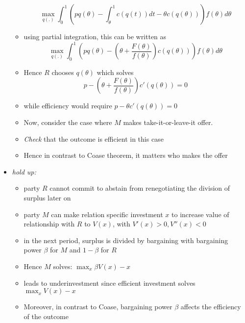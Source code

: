 \documentclass[11pt,english]{beamer}
\begin{document}
\begin{frame}[allowframebreaks]
\begin{itemize}
\begin{itemize}
\begin{equation*}
      \max_{q(.)} \int_0^1 (pq(\theta)-\int_\theta^1 c(q(t))dt -\theta c(q(\theta)))f(\theta)d\theta
    \end{equation*}
  \item using partial integration, this can be written as
    \begin{equation*}
      \max_{q(.)} \int_0^1
      (pq(\theta)-\left(\theta+\frac{F(\theta)}{f(\theta)} \right) c(q(\theta)))f(\theta)d\theta
    \end{equation*}
  \item Hence $R$ chooses $q(\theta)$ which solves
    \begin{equation*}
      p-\left(\theta+\frac{F(\theta)}{f(\theta)} \right) c'(q(\theta))=0
    \end{equation*}
  \item while efficiency would require $p-\theta c'(q(\theta)) =0$
  \item Now, consider the case where $M$ makes take-it-or-leave-it
    offer.
  \item \emph{Check} that the outcome is efficient in this case
  \item Hence in contrast to Coase theorem, it matters who makes the offer
    \end{itemize}
  \item \emph{hold up:}
    \begin{itemize}
    \item party $R$ cannot commit to abstain from renegotiating the division
      of surplus later on
    \item party $M$ can make relation specific investment $x$ to
    increase value of relationship with $R$ to $V(x)$, with $V'(x)>0, V''(x)<0$
  \item in the next period, surplus is divided by bargaining with bargaining
    power $\beta$ for $M$ and $1-\beta$ for $R$
  \item Hence $M$ solves: $\max_x \beta V(x) - x$
  \item leads to underinvestment since efficient investment solves
    $\max_x V(x) -x$
  \item Moreover, in contrast to Coase, bargaining power $\beta$
    affects the efficiency of the outcome
    \end{itemize}
  \end{itemize} %
\end{frame}
\end{document}
